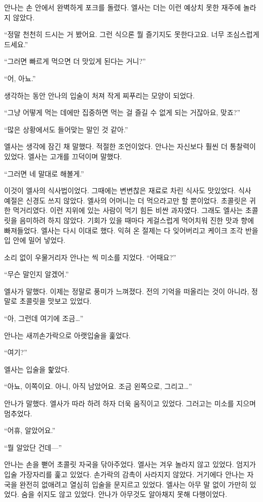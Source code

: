안나는 손 안에서 완벽하게 포크를 돌렸다. 엘사는 더는 이런 예상치 못한 재주에 놀라지 않았다.

``정말 천천히 드시는 거 봤어요. 그런 식으론 뭘 즐기지도 못한다고요. 너무 조심스럽게 드세요.''

``그러면 빠르게 먹으면 더 맛있게 된다는 거니?''

``어, 아뇨.''

생각하는 동안 안나의 입술이 처져 작게 찌푸리는 모양이 되었다.

``그냥 어떻게 먹는 데에만 집중하면 먹는 걸 즐길 수 없게 되는 거잖아요, 맞죠?''

`` 많은 상황에서도 들어맞는 말인 것 같아.''

엘사는 생각에 잠긴 채 말했다. 적절한 조언이었다. 안나는 자신보다 훨씬 더 통찰력이 있었다. 엘사는 고개를 끄덕이며 말했다.

``그러면 네 말대로 해볼게.''

이것이 엘사의 식사법이었다. 그때에는 변변찮은 재료로 차린 식사도 맛있었다. 식사 예절은 신경도 쓰지 않았다. 엘사의 어머니는 더 먹으라고만 할 뿐이었다. 초콜릿은 귀한 먹거리였다. 이런 지위에 있는 사람이 먹기 힘든 비싼 과자였다. 그래도 엘사는 초콜릿을 음미하려 하지 않았다. 기회가 있을 때마다 게걸스럽게 먹어치워 진한 맛과 향에 빠져들었다. 엘사는 다시 이대로 했다. 익혀 온 절제는 다 잊어버리고 케이크 조각 반을 입 안에 밀어 넣었다.

소리 없이 우물거리자 안나는 씩 미소를 지었다. ``어때요?''

``무슨 말인지 알겠어.''

엘사가 말했다. 이제는 정말로 풍미가 느껴졌다. 전의 기억을 떠올리는 것이 아니라, 정말로 초콜릿을 맛보고 있었다.

``아, 그런데 여기에 조금\ldots''

안나는 새끼손가락으로 아랫입술을 훑었다.

``여기?''

엘사는 입술을 핥았다.

``아뇨, 이쪽이요. 아니, 아직 남았어요. 조금 왼쪽으로, 그리고\ldots''

안나가 말했다. 엘사가 따라 하려 하자 더욱 움직이고 있었다. 그러고는 미소를 지으며 멈추었다.

``어휴, 알았어요.''

``뭘 알았단 건데—''

안나는 손을 뻗어 초콜릿 자국을 닦아주었다. 엘사는 겨우 놀라지 않고 있었다. 엄지가 입술 가장자리를 훑고 있었다. 손가락의 감촉이 사라지지 않았다. 거기에다 안나는 자국을 완전히 없애려고 열심히 입술을 문지르고 있었다. 엘사는 아무 말 없이 가만히 있었다. 숨을 쉬지도 않고 있었다. 안나가 아무것도 알아채지 못해 다행이었다.

